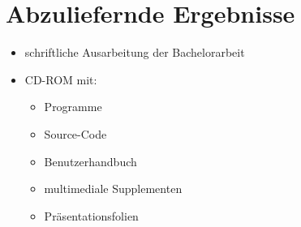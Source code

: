 \chapter{Abzuliefernde Ergebnisse}
\begin{itemize}
	\item schriftliche Ausarbeitung der Bachelorarbeit
	\item CD-ROM mit:
	\begin{itemize}
		\item Programme
		\item Source-Code
		\item Benutzerhandbuch
		\item multimediale Supplementen
		\item Präsentationsfolien
	\end{itemize}
\end{itemize}